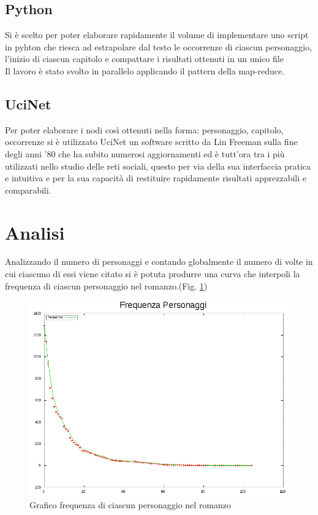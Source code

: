 \documentclass[a4paper]{article}
\begin{document}
\subsection{Python}
Si è scelto per poter elaborare rapidamente il volume di implementare uno script in pyhton che riesca ad estrapolare dal testo le occorrenze di ciascun personaggio, l'inizio di ciascun capitolo e compattare i risultati ottenuti in un unico file\\
Il lavoro è stato svolto in parallelo applicando il pattern della map-reduce.


\subsection{UciNet}
Per poter elaborare i nodi così ottenuti nella forma: personaggio, capitolo, occorrenze si è utilizzato UciNet\cite{UciNet} un software scritto da Lin Freeman sulla fine degli anni '80 che ha subito numerosi aggiornamenti ed è tutt'ora tra i più utilizzati nello studio delle reti sociali, questo per via della sua interfaccia pratica e intuitiva e per la sua capacità di restituire rapidamente risultati apprezzabili e comparabili.

\section{Analisi}

Analizzando il numero di personaggi e contando globalmente il numero di volte in cui ciascuno di essi viene citato si è potuta produrre una curva che interpoli la frequenza di ciascun personaggio nel romanzo.(Fig. \ref{fig:frequenza-personaggi})

\begin{figure}[h]
\centering
\includegraphics[width=.8\textwidth]{picture/frequenza_personaggi.png}
\caption{Grafico frequenza di ciascun personaggio nel romanzo}
\label{fig:frequenza-personaggi}
\end{figure}
\end{document}
